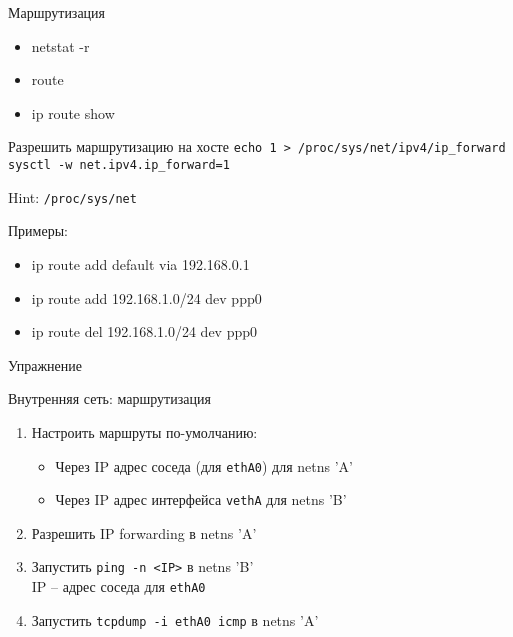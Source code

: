 \begin{frame}{Маршрутизация}
	\begin{itemize}
		\item netstat -r
		\item route
		\item ip route show
	\end{itemize}

	\begin{block}{Разрешить маршрутизацию на хосте}
		{\tt echo 1 > /proc/sys/net/ipv4/ip\_forward}\\
		{\tt sysctl -w net.ipv4.ip\_forward=1}
	\end{block}
	
	Hint: {\tt /proc/sys/net}

	Примеры:
	\begin{itemize}
		\item ip route add default via 192.168.0.1
		\item ip route add 192.168.1.0/24 dev ppp0
		\item ip route del 192.168.1.0/24 dev ppp0
	\end{itemize}

\end{frame}


\begin{frame}[fragile]{Упражнение}
    \begin{block}{Внутренняя сеть: маршрутизация}
        \begin{enumerate}
            \item Настроить маршруты по-умолчанию:
                \begin{itemize}
                    \item Через IP адрес соседа (для {\tt ethA0}) для netns 'A'
                    \item Через IP адрес интерфейса {\tt vethA} для netns 'B'
                \end{itemize}
            \item Разрешить IP forwarding в netns 'A'
            \item Запустить {\tt ping -n <IP>} в netns 'B'\\
                IP -- адрес соседа для {\tt ethA0}
            \item Запустить {\tt tcpdump -i ethA0 icmp} в netns 'A'
        \end{enumerate}
    \end{block}
\end{frame}
